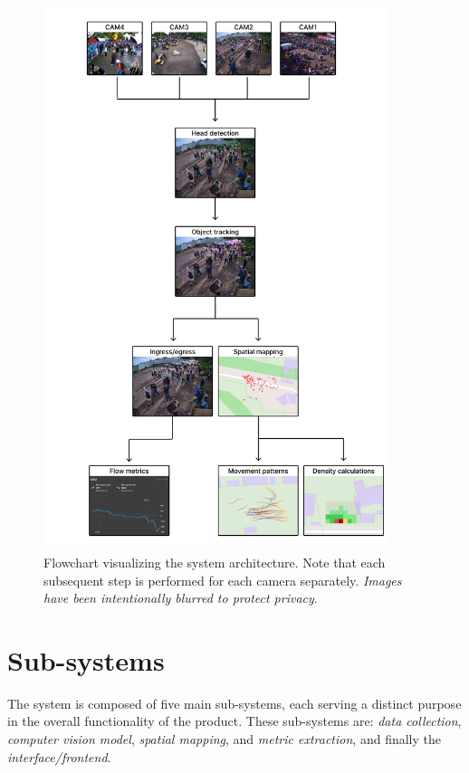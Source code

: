 \begin{figure}[h!]
  \centering
  \includegraphics[width=0.9\textwidth]{Pictures/Figures/system_flowchart.png}
  \caption{Flowchart visualizing the system architecture. Note that each subsequent step is performed for each camera separately.
    \textit{Images have been intentionally blurred to protect privacy}.}
  \label{fig:system_flowchart}
\end{figure}


\section{Sub-systems}
\label{sec:sub_systems}
The system is composed of five main sub-systems, each serving a distinct purpose in the overall functionality of the product. These sub-systems are: \textit{data collection}, \textit{computer vision model}, \textit{spatial mapping}, and \textit{metric extraction}, and finally the \textit{interface/frontend}.

